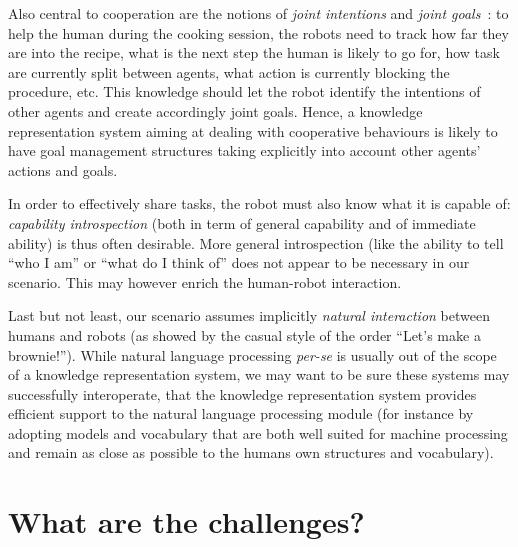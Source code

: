 Also central to cooperation are the notions of \emph{joint
intentions} and \emph{joint goals}~\cite{Tomasello2005, Bratman2009}: to help
the human during the cooking session, the robots need to track how far
they are into the recipe, what is the next step the human is likely to go for,
how task are currently split between agents, what action is currently
blocking the procedure, etc. This knowledge should let the robot identify the
intentions of other agents and create accordingly joint goals. Hence, a
knowledge representation system aiming at dealing with cooperative behaviours
is likely to have goal management structures taking explicitly into account
other agents' actions and goals.

In order to effectively share tasks, the robot must also know what it is
capable of: \emph{capability introspection} (both in term of general capability
and of immediate ability) is thus often desirable. More general introspection
(like the ability to tell ``who I am'' or ``what do I think of'' does not
appear to be necessary in our scenario. This may however enrich the human-robot
interaction.

Last but not least, our scenario assumes implicitly \emph{natural interaction}
between humans and robots (as showed by the casual style of the
order ``Let's make a brownie!''). While natural language processing {\it
per-se} is usually out of the scope of a knowledge representation system, we
may want to be sure these systems may successfully interoperate, \ie that the
knowledge representation system provides efficient support to the natural
language processing module (for instance by adopting models and vocabulary that
are both well suited for machine processing and remain as close as possible to
the humans own structures and vocabulary).



\section{What are the challenges?}
\label{sect|scenario-challenges}


